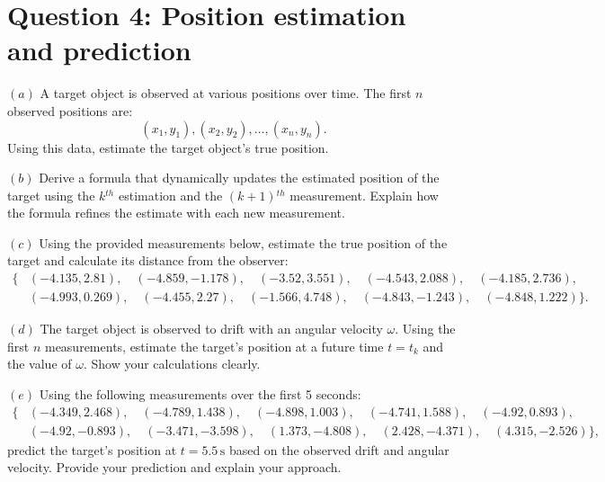 \documentclass[a4paper, 12pt]{exam}
\begin{document}
\pagebreak
\section*{Question 4: Position estimation and prediction}

\noindent $(a)$ A target object is observed at various positions over time. The first \(n\) observed positions are:
\[
(x_1, y_1), (x_2, y_2), \dots, (x_n, y_n).
\]
Using this data, estimate the target object's true position. 
\bigskip

\noindent $(b)$ Derive a formula that dynamically updates the estimated position of the target using the \(k\)$^{th}$ estimation and the \((k+1)\)$^{th}$ measurement. Explain how the formula refines the estimate with each new measurement.

\bigskip

\noindent $(c)$ Using the provided measurements below, estimate the true position of the target and calculate its distance from the observer:
\[
\begin{aligned}
\{ 
&(-4.135, 2.81), \quad (-4.859, -1.178), \quad (-3.52, 3.551), \quad (-4.543, 2.088), \quad  (-4.185, 2.736), \\
&(-4.993, 0.269), \quad (-4.455, 2.27), \quad (-1.566, 4.748), \quad (-4.843, -1.243), \quad (-4.848, 1.222)
\}.
\end{aligned}
\]

\bigskip

\noindent $(d)$ The target object is observed to drift with an angular velocity $\omega$. Using the first \(n\) measurements, estimate the target’s position at a future time \(t = t_k\) and the value of $\omega$. Show your calculations clearly.

\bigskip

\noindent $(e)$ Using the following measurements over the first 5 seconds:
\[
\begin{aligned}
\{ 
&(-4.349, 2.468), \quad (-4.789, 1.438), \quad (-4.898, 1.003), \quad (-4.741, 1.588), \quad (-4.92, 0.893), \\
&(-4.92, -0.893), \quad (-3.471, -3.598), \quad (1.373, -4.808), \quad (2.428, -4.371), \quad (4.315, -2.526)
\},
\end{aligned}
\]
predict the target's position at \(t = 5.5 \, \text{s}\) based on the observed drift and angular velocity. Provide your prediction and explain your approach.

\bigskip
\end{document}
